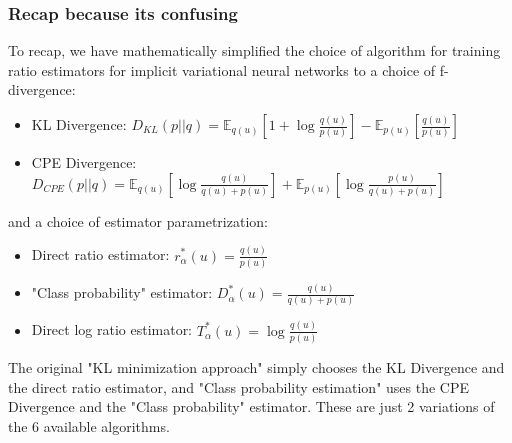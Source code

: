 \documentclass[a4paper,12pt]{article}
\numberwithin{equation}{section}
\begin{document}
\subsubsection{Recap because its confusing}
To recap, we have mathematically simplified the choice of algorithm for training ratio estimators for implicit variational neural networks to a choice of f-divergence:
\begin{itemize}
\item KL Divergence: $D_{KL}(p||q)=\mathbb{E}_{q(u)}[1+\log \frac{q(u)}{p(u)}]-\mathbb{E}_{p(u)}\left[\frac{q(u)}{p(u)}\right]$
\item CPE Divergence: $D_{CPE}(p||q)=\mathbb{E}_{q(u)}\left[\log \frac{q(u)}{q(u)+p(u)}\right]+\mathbb{E}_{p(u)}\left[\log \frac{p(u)}{q(u)+p(u)}\right]$
\end{itemize}
and a choice of estimator parametrization:
\begin{itemize}
\item Direct ratio estimator: $r^*_\alpha(u)=\frac{q(u)}{p(u)}$
\item "Class probability" estimator: $D^*_\alpha(u)=\frac{q(u)}{q(u)+p(u)}$
\item Direct log ratio estimator: $T^*_\alpha(u)=\log \frac{q(u)}{p(u)}$
\end{itemize}
The original "KL minimization approach" simply chooses the KL Divergence and the direct ratio estimator, and "Class probability estimation" uses the CPE Divergence and the "Class probability" estimator. These are just 2 variations of the 6 available algorithms.
\end{document}
